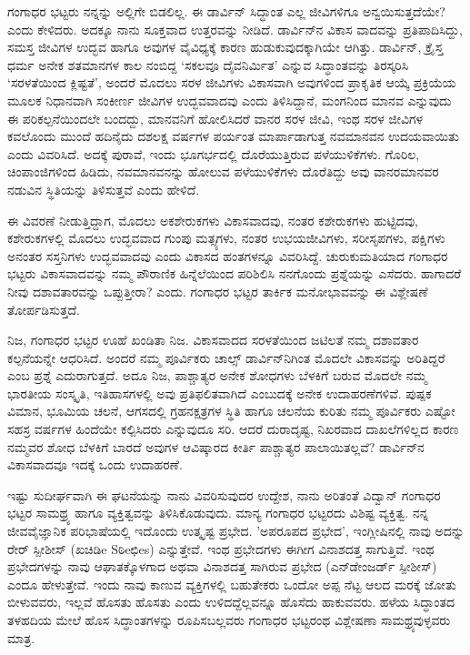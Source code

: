 {ಗಂಗಾಧರ ಭಟ್ಟರು ನನ್ನನ್ನು ಅಲ್ಲಿಗೇ ಬಿಡಲಿಲ್ಲ.  ಈ ಡಾರ್ವಿನ್ ಸಿದ್ಧಾಂತ ಎಲ್ಲ ಜೀವಿಗಳಿಗೂ ಅನ್ವಯಿಸುತ್ತದೆಯೇ? ಎಂದು ಕೇಳಿದರು.  ಅದಕ್ಕೂ ನಾನು ಸೂಕ್ತವಾದ ಉತ್ತರವನ್ನು ನೀಡಿದೆ.  ಡಾರ್ವಿನ್‍ನ ವಿಕಾಸ ವಾದವನ್ನು ಪ್ರತಿಪಾದಿಸಿದ್ದು, ಸಮಸ್ತ ಜೀವಿಗಳ ಉದ್ಭವ ಹಾಗೂ ಅವುಗಳ ವೈವಿಧ್ಯಕ್ಕೆ ಕಾರಣ ಹುಡುಕುವುದಕ್ಕಾಗಿಯೇ ಆಗಿತ್ತು.  ಡಾರ್ವಿನ್, ಕ್ರೈಸ್ತ ಧರ್ಮ ಅನೇಕ ಶತಮಾನಗಳ ಕಾಲ ನಂಬಿದ್ದ ‘ಸಕಲವೂ ದೈವ\-ನಿರ್ಮಿತ’ ಎನ್ನುವ ಸಿದ್ಧಾಂತವನ್ನು ತಿರಸ್ಕರಿಸಿ ‘ಸರಳತೆಯಿಂದ ಕ್ಲಿಷ್ಟತೆ’, ಅಂದರೆ ಮೊದಲು ಸರಳ ಜೀವಿಗಳು ವಿಕಾಸವಾಗಿ ಅವುಗಳಿಂದ ಪ್ರಾಕೃತಿಕ ಆಯ್ಕೆ ಪ್ರಕ್ರಿಯೆಯ ಮೂಲಕ ನಿಧಾನವಾಗಿ ಸಂಕೀರ್ಣ ಜೀವಿಗಳ ಉದ್ಭವವಾದವು ಎಂದು ತಿಳಿಸಿದ್ದಾನೆ, ಮಂಗನಿಂದ ಮಾನವ ಎನ್ನುವುದು ಈ ಪರಿಕಲ್ಪನೆಯಿಂದಲೇ ಬಂದದ್ದು, ಮಾನವನಿಗೆ ಹೋಲಿಸಿದರೆ ವಾನರ ಸರಳ ಜೀವಿ, ಇಂಥ ಸರಳ ಜೀವಿಗಳ ಕವಲೊಂದು ಮುಂದೆ ಹದಿನೈದು ದಶಲಕ್ಷ ವರ್ಷಗಳ ಪರ್ಯಂತ ಮಾರ್ಪಾಡಾಗುತ್ತ ನವಮಾನವನ ಉದಯ\-ವಾಯಿತು ಎಂದು ವಿವರಿಸಿದೆ.  ಅದಕ್ಕೆ ಪುರಾವೆ, ಇಂದು ಭೂಗರ್ಭದಲ್ಲಿ ದೊರೆಯುತ್ತಿರುವ ಪಳೆಯುಳಿಕೆಗಳು.  ಗೊರಿಲ, ಚಿಂಪಾಂಜಿಗಳಿಂದ ಹಿಡಿದು, ನವಮಾನವನನ್ನು ಹೋಲುವ ಪಳೆಯುಳಿಕೆಗಳು ದೊರೆತಿದ್ದು ಅವು ವಾನರ\enginline{-}ಮಾನವರ ನಡುವಿನ ಸ್ಥಿತಿಯನ್ನು ತಿಳಿಸುತ್ತವೆ ಎಂದು ಹೇಳಿದೆ.  
\vskip 4pt

ಈ ವಿವರಣೆ ನೀಡುತ್ತಿದ್ದಾಗ, ಮೊದಲು ಅಕಶೇರುಕಗಳು ವಿಕಾಸವಾದವು, ನಂತರ ಕಶೇರುಕಗಳು ಹುಟ್ಟಿದವು, ಕಶೇರುಕಗಳಲ್ಲಿ ಮೊದಲು ಉದ್ಭವವಾದ ಗುಂಪು ಮತ್ಸ್ಯಗಳು, ನಂತರ ಉಭಯಜೀವಿಗಳು, ಸರೀಸೃಪಗಳು, ಪಕ್ಷಿಗಳು ಅನಂತರ ಸಸ್ತನಿಗಳು ಉದ್ಭವವಾದವು ಎಂದು ವಿಕಾಸದ ಹಂತಗಳನ್ನೂ ವಿವರಿಸಿದ್ದೆ.  ಚುರುಕುಮತಿಯಾದ ಗಂಗಾಧರ ಭಟ್ಟರು ವಿಕಾಸವಾದವನ್ನು ನಮ್ಮ ಪೌರಾಣಿಕ ಹಿನ್ನೆಲೆಯಿಂದ ಪರಿಶಿಲಿಸಿ ನನಗೊಂದು ಪ್ರಶ್ನೆಯನ್ನು ಎಸೆದರು.  ಹಾಗಾದರೆ ನೀವು ದಶಾವತಾರವನ್ನು ಒಪ್ಪುತ್ತೀರಾ? ಎಂದು.  ಗಂಗಾಧರ ಭಟ್ಟರ ತಾರ್ಕಿಕ ಮನೋಭಾವವನ್ನು ಈ ವಿಶ್ಲೇಷಣೆ ತೋರ್ಪಡಿಸುತ್ತದೆ. 
\vskip 4pt

ನಿಜ, ಗಂಗಾಧರ ಭಟ್ಟರ ಊಹೆ ಖಂಡಿತಾ ನಿಜ.  ವಿಕಾಸವಾದದ ಸರಳತೆಯಿಂದ ಜಟಿಲತೆ ನಮ್ಮ ದಶಾವತಾರ ಕಲ್ಪನೆಯನ್ನೇ ಆಧರಿಸಿದೆ.  ಅಂದರೆ ನಮ್ಮ ಪೂರ್ವಿಕರು ಚಾಲ್ಸ್ ಡಾರ್ವಿನ್‍ನಿಗಿಂತ ಮೊದಲೇ ವಿಕಾಸವನ್ನು ಅರಿತಿದ್ದರೆ ಎಂಬ ಪ್ರಶ್ನೆ ಎದುರಾಗುತ್ತದೆ.  ಅದೂ ನಿಜ, ಪಾಶ್ಚಾತ್ಯರ ಅನೇಕ ಶೋಧಗಳು ಬೆಳಕಿಗೆ ಬರುವ ಮೊದಲೇ ನಮ್ಮ ಭಾರತೀಯ ಸಂಸ್ಕೃತಿ, ಇತಿಹಾಸಗಳಲ್ಲಿ ಅವು ಪ್ರತಿಫಲಿತವಾಗಿದೆ ಎಂಬುದಕ್ಕೆ ಅನೇಕ ಉದಾಹರಣೆಗಳಿವೆ.  ಪುಷ್ಪಕ ವಿಮಾನ, ಭೂಮಿಯ ಚಲನೆ, ಆಗಸದಲ್ಲಿ ಗ್ರಹ\enginline{-}ನಕ್ಷತ್ರಗಳ ಸ್ಥಿತಿ ಹಾಗೂ ಚಲನೆಯ ಕುರಿತು ನಮ್ಮ ಪೂರ್ವಿಕರು ಎಷ್ಟೋ ಸಹಸ್ರ ವರ್ಷಗಳ ಹಿಂದೆಯೇ ಕಲ್ಪಿಸಿದರು ಎನ್ನುವುದೂ ಸರಿ.  ಆದರೆ ದುರಾದೃಷ್ಟ, ನಿಖರವಾದ ದಾಖಲೆ\-ಗಳಿಲ್ಲದ ಕಾರಣ ನಮ್ಮವರ ಶೋಧ ಬೆಳಕಿಗೆ ಬಾರದೆ ಅವುಗಳ ಆವಿಷ್ಕಾರದ ಕೀರ್ತಿ ಪಾಶ್ಚಾತ್ಯರ ಪಾಲಾಯಿತಲ್ಲವೆ?  ಡಾರ್ವಿನ್‍ನ ವಿಕಾಸವಾದವೂ ಇದಕ್ಕೆ ಒಂದು ಉದಾಹರಣೆ.   

ಇಷ್ಟು ಸುದೀರ್ಘವಾಗಿ ಈ ಘಟನೆಯನ್ನು ನಾನು ವಿವರಿಸುವುದರ ಉದ್ದೇಶ, ನಾನು ಅರಿತಂತೆ ವಿದ್ವಾನ್ ಗಂಗಾಧರ ಭಟ್ಟರ ಸಾಮಥ್ರ್ಯ ಹಾಗೂ ವ್ಯಕ್ತಿತ್ವವನ್ನು ತಿಳಿಸಿ\-ಕೊಡುವುದು.  ಮಾನ್ಯ ಗಂಗಾಧರ ಭಟ್ಟರದು ವಿಶಿಷ್ಟ ವ್ಯಕ್ತಿತ್ವ.  ನನ್ನ ಜೀವವೈಜ್ಞಾನಿಕ ಪರಿಭಾಷೆ\-ಯಲ್ಲಿ ಇದೊಂದು ಉತ್ಕೃಷ್ಟ ಪ್ರಭೇದ.  'ಅಪರೂಪದ ಪ್ರಭೇದ', ಇಂಗ್ಲೀಷಿನಲ್ಲಿ ನಾವು ಅದನ್ನು ರೇರ್ ಸ್ಪೀಶೀಸ್ (ಖಚಿಡಿe Sಠಿeಛಿes) ಎನ್ನುತ್ತೇವೆ.  ಇಂಥ ಪ್ರಭೇದಗಳು ಈಗೀಗ ವಿನಾಶದತ್ತ ಸಾಗುತ್ತಿವೆ.  ಇಂಥ ಪ್ರಭೇದಗಳನ್ನು ನಾವು ಆಘಾತಕ್ಕೊಳಗಾದ ಅಥವಾ ವಿನಾಶದತ್ತ ಸಾಗಿರುವ ಪ್ರಭೇದ (ಎನ್‍ಡೇಂಜರ್ಡ್ ಸ್ಪೀಶೀಸ್) ಎಂದೂ ಹೇಳುತ್ತೇವೆ.  ಇಂದು ನಾವು ಕಾಣುವ ವ್ಯಕ್ತಿಗಳಲ್ಲಿ ಬಹುತೇಕರು ಒಂದೋ ಅಪ್ಪ ನೆಟ್ಟ ಆಲದ ಮರಕ್ಕೆ ಜೋತು ಬೀಳುವವರು, ಇಲ್ಲವೆ ಹೊಸತು ಹೊಸತು ಎಂದು ಉಳಿದದ್ದೆಲ್ಲವನ್ನೂ ಹೊಸೆದು ಹಾಕುವವರು.  ಹಳೆಯ ಸಿದ್ಧಾಂತದ ತಳಹದಿಯ ಮೇಲೆ ಹೊಸ ಸಿದ್ಧಾಂತ\-ಗಳನ್ನು ರೂಪಿಸಬಲ್ಲವರು ಗಂಗಾಧರ ಭಟ್ಟರಂಥ ವಿಶ್ಲೇಷಣಾ ಸಾಮಥ್ರ್ಯವುಳ್ಳವರು ಮಾತ್ರ.              

}
